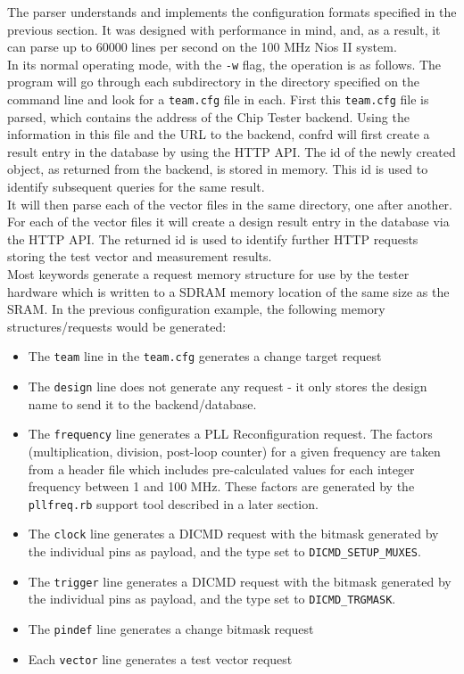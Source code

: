 The parser understands and implements the configuration formats specified in the previous
section. It was designed with performance in mind, and, as a result, it can parse up to
60000 lines per second on the 100 MHz Nios II system.
\\

In its normal operating mode, with the \texttt{-w} flag, the operation is as follows.
The program will go through each subdirectory in the directory specified on the command
line and look for a \texttt{team.cfg} file in each. First this \texttt{team.cfg} file
is parsed, which contains the address of the Chip Tester backend. Using the information
in this file and the URL to the backend, confrd will first create a result entry in
the database by using the HTTP API. The id of the newly created object, as returned
from the backend, is stored in memory. This id is used to identify subsequent queries
for the same result.
\\

It will then parse each of the vector files in the same directory, one after another.
For each of the vector files it will create a design result entry in the database via
the HTTP API. The returned id is used to identify further HTTP requests storing the
test vector and measurement results.
\\

Most keywords generate a request memory structure for use by the tester hardware
which is written to a SDRAM memory location
of the same size as the SRAM. In the previous configuration example, the following
memory structures/requests would be generated:
\begin{itemize}
 \item The \texttt{team} line in the \texttt{team.cfg} generates a change target request
 \item The \texttt{design} line does not generate any request - it only stores the design name to send it to the backend/database.
 \item The \texttt{frequency} line generates a PLL Reconfiguration request. The factors (multiplication, division, post-loop counter) for a given frequency are taken from a header file
which includes pre-calculated values for each integer frequency between 1 and 100 MHz. These factors are generated by the \texttt{pllfreq.rb} support tool described in a later section.
 \item The \texttt{clock} line generates a DICMD request with the bitmask generated by the individual pins as payload, and the type set to \texttt{DICMD\_SETUP\_MUXES}.
 \item The \texttt{trigger} line generates a DICMD request with the bitmask generated by the individual pins as payload, and the type set to \texttt{DICMD\_TRGMASK}.
 \item The \texttt{pindef} line generates a change bitmask request
 \item Each \texttt{vector} line generates a test vector request
\end{itemize}


